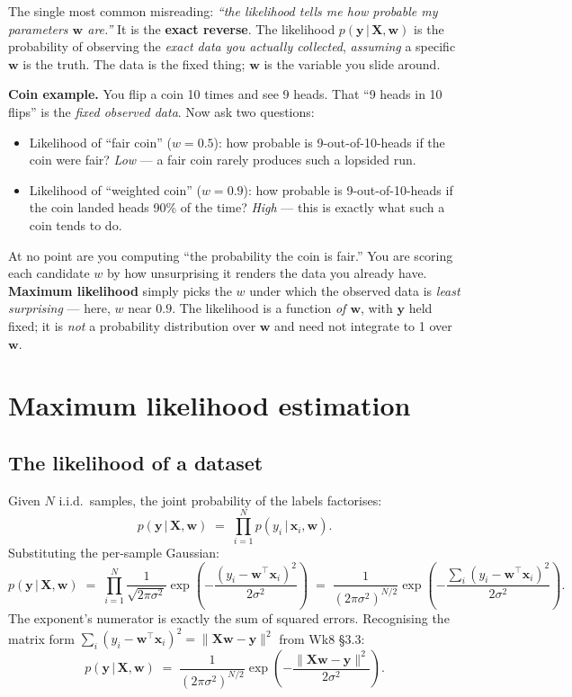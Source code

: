 \documentclass[11pt, a4paper]{article}
\begin{document}
\begin{trapbox}
The single most common misreading: \emph{``the likelihood tells me how probable my parameters $\mathbf{w}$ are.''} It is the \textbf{exact reverse}. The likelihood $p(\mathbf{y}\,|\,\mathbf{X},\mathbf{w})$ is the probability of observing the \emph{exact data you actually collected}, \emph{assuming} a specific $\mathbf{w}$ is the truth. The data is the fixed thing; $\mathbf{w}$ is the variable you slide around.

\textbf{Coin example.} You flip a coin 10 times and see 9 heads. That ``9 heads in 10 flips'' is the \emph{fixed observed data}. Now ask two questions:
\begin{itemize}
  \item Likelihood of ``fair coin'' ($w = 0.5$): how probable is 9-out-of-10-heads if the coin were fair? \emph{Low} --- a fair coin rarely produces such a lopsided run.
  \item Likelihood of ``weighted coin'' ($w = 0.9$): how probable is 9-out-of-10-heads if the coin landed heads 90\% of the time? \emph{High} --- this is exactly what such a coin tends to do.
\end{itemize}
At no point are you computing ``the probability the coin is fair.'' You are scoring each candidate $w$ by how unsurprising it renders the data you already have. \textbf{Maximum likelihood} simply picks the $w$ under which the observed data is \emph{least surprising} --- here, $w$ near $0.9$. The likelihood is a function \emph{of $\mathbf{w}$}, with $\mathbf{y}$ held fixed; it is \emph{not} a probability distribution over $\mathbf{w}$ and need not integrate to 1 over $\mathbf{w}$.
\end{trapbox}

\section{Maximum likelihood estimation}

\subsection{The likelihood of a dataset}

Given $N$ i.i.d.\ samples, the joint probability of the labels factorises:
\[
p(\mathbf{y}\,|\,\mathbf{X},\mathbf{w}) \;=\; \prod_{i=1}^N p(y_i\,|\,\mathbf{x}_i,\mathbf{w}).
\]
Substituting the per-sample Gaussian:
\[
p(\mathbf{y}\,|\,\mathbf{X},\mathbf{w}) \;=\; \prod_{i=1}^N \frac{1}{\sqrt{2\pi\sigma^2}}\exp\!\left(-\frac{(y_i-\mathbf{w}^\top\mathbf{x}_i)^2}{2\sigma^2}\right)
\;=\; \frac{1}{(2\pi\sigma^2)^{N/2}}\exp\!\left(-\frac{\sum_i(y_i-\mathbf{w}^\top\mathbf{x}_i)^2}{2\sigma^2}\right).
\]
The exponent's numerator is exactly the sum of squared errors. Recognising the matrix form $\sum_i(y_i-\mathbf{w}^\top\mathbf{x}_i)^2 = \|\mathbf{X}\mathbf{w}-\mathbf{y}\|^2$ from Wk8 §3.3:
\[
\boxed{\;p(\mathbf{y}\,|\,\mathbf{X},\mathbf{w}) \;=\; \frac{1}{(2\pi\sigma^2)^{N/2}}\exp\!\left(-\frac{\|\mathbf{X}\mathbf{w}-\mathbf{y}\|^2}{2\sigma^2}\right).\;}
\]
\end{document}
